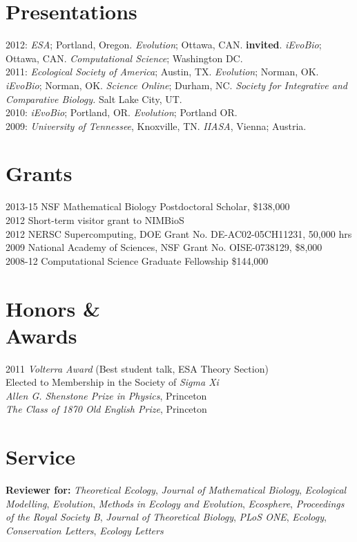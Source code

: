 \documentclass[margin]{res}
\begin{document}
\begin{resume}
\section{Presentations} 
2012:  \emph{ESA}; Portland, Oregon.   \emph{Evolution}; Ottawa, CAN. \textbf{invited}. \emph{iEvoBio}; Ottawa, CAN. \emph{Computational Science}; Washington DC. \\ 
2011:  \emph{Ecological Society of America}; Austin, TX.  \emph{Evolution}; Norman, OK. \emph{iEvoBio}; Norman, OK. \emph{Science Online}; Durham, NC. \emph{Society for Integrative and Comparative Biology.} Salt Lake City, UT. \\
2010: \emph{iEvoBio}; Portland, OR. \emph{Evolution}; Portland OR. \\
2009: \emph{University of Tennessee}, Knoxville, TN.  \emph{IIASA}, Vienna; Austria.

\section{Grants}

2013-15 NSF Mathematical Biology Postdoctoral Scholar, \$138,000 \\
2012 Short-term visitor grant to NIMBioS \\
2012 NERSC Supercomputing, DOE Grant No. DE-AC02-05CH11231, 50,000 hrs \\
2009 National Academy of Sciences, NSF Grant No. OISE-0738129, \$8,000 \\
2008-12 Computational Science Graduate Fellowship \$144,000 

\section{Honors \& \\ Awards}
2011 \emph{Volterra Award} (Best student talk, ESA Theory Section) \\
Elected to Membership in the Society of \emph{Sigma Xi} \\
\emph{Allen G. Shenstone Prize in Physics}, Princeton \\
\emph{The Class of 1870 Old English Prize},  Princeton 


\section{Service}
\textbf{Reviewer for:}   \emph{Theoretical Ecology}, \emph{Journal of Mathematical Biology}, \emph{Ecological Modelling},
\emph{Evolution}, \emph{Methods in Ecology and Evolution}, \emph{Ecosphere}, \emph{Proceedings of the Royal Society B}, \emph{Journal of Theoretical Biology}, \emph{PLoS ONE}, \emph{Ecology}, \emph{Conservation Letters}, \emph{Ecology Letters} 



\end{resume}
\end{document}
